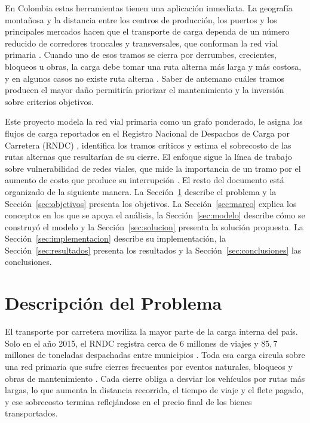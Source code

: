 \documentclass[conference]{IEEEtran}
\begin{document}
En Colombia estas herramientas tienen una aplicación inmediata. La geografía
montañosa y la distancia entre los centros de producción, los puertos y los
principales mercados hacen que el transporte de carga dependa de un número
reducido de corredores troncales y transversales, que conforman la red vial
primaria \cite{ocha_hdx_roads}. Cuando uno de esos tramos se cierra por
derrumbes, crecientes, bloqueos u obras, la carga debe tomar una ruta alterna
más larga y más costosa, y en algunos casos no existe ruta alterna
\cite{cambio_radiografia}. Saber de antemano cuáles tramos producen el mayor
daño permitiría priorizar el mantenimiento y la inversión sobre criterios
objetivos.

Este proyecto modela la red vial primaria como un grafo ponderado, le asigna los
flujos de carga reportados en el Registro Nacional de Despachos de Carga por
Carretera (RNDC) \cite{rndc}, identifica los tramos críticos y estima el
sobrecosto de las rutas alternas que resultarían de su cierre. El enfoque sigue
la línea de trabajo sobre vulnerabilidad de redes viales, que mide la
importancia de un tramo por el aumento de costo que produce su interrupción
\cite{jenelius2006}. El resto del documento está organizado de la siguiente
manera. La Sección~\ref{sec:descripcion} describe el problema y la
Sección~\ref{sec:objetivos} presenta los objetivos. La
Sección~\ref{sec:marco} explica los conceptos en los que se apoya el
análisis, la Sección~\ref{sec:modelo} describe cómo se construyó el
modelo y la Sección~\ref{sec:solucion} presenta la solución propuesta. La
Sección~\ref{sec:implementacion} describe su implementación, la
Sección~\ref{sec:resultados} presenta los resultados y la
Sección~\ref{sec:conclusiones} las conclusiones.

\section{Descripción del Problema}
\label{sec:descripcion}

El transporte por carretera moviliza la mayor parte de la carga interna del
país. Solo en el año 2015, el RNDC registra cerca de $6$ millones de viajes y
$85{,}7$ millones de toneladas despachadas entre municipios \cite{rndc}. Toda
esa carga circula sobre una red primaria que sufre cierres frecuentes por
eventos naturales, bloqueos y obras de mantenimiento \cite{cambio_radiografia}.
Cada cierre obliga a desviar los vehículos por rutas más largas, lo que aumenta
la distancia recorrida, el tiempo de viaje y el flete pagado, y ese sobrecosto
termina reflejándose en el precio final de los bienes transportados.
\end{document}
